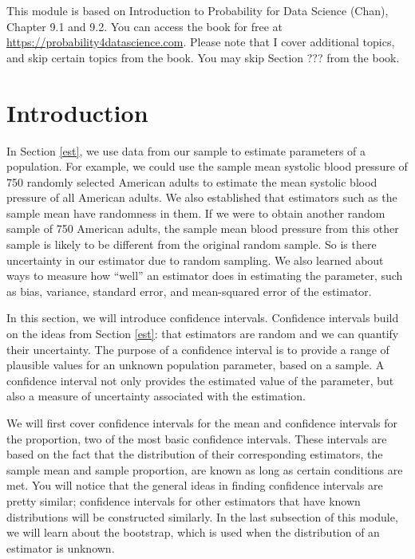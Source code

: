 \documentclass[
]{book}
\begin{document}
This module is based on Introduction to Probability for Data Science (Chan), Chapter 9.1 and 9.2. You can access the book for free at \url{https://probability4datascience.com}. Please note that I cover additional topics, and skip certain topics from the book. You may skip Section ??? from the book.

\section{Introduction}\label{introduction-4}

In Section \ref{est}, we use data from our sample to estimate parameters of a population. For example, we could use the sample mean systolic blood pressure of 750 randomly selected American adults to estimate the mean systolic blood pressure of all American adults. We also established that estimators such as the sample mean have randomness in them. If we were to obtain another random sample of 750 American adults, the sample mean blood pressure from this other sample is likely to be different from the original random sample. So is there uncertainty in our estimator due to random sampling. We also learned about ways to measure how ``well'' an estimator does in estimating the parameter, such as bias, variance, standard error, and mean-squared error of the estimator.

In this section, we will introduce confidence intervals. Confidence intervals build on the ideas from Section \ref{est}: that estimators are random and we can quantify their uncertainty. The purpose of a confidence interval is to provide a range of plausible values for an unknown population parameter, based on a sample. A confidence interval not only provides the estimated value of the parameter, but also a measure of uncertainty associated with the estimation.

We will first cover confidence intervals for the mean and confidence intervals for the proportion, two of the most basic confidence intervals. These intervals are based on the fact that the distribution of their corresponding estimators, the sample mean and sample proportion, are known as long as certain conditions are met. You will notice that the general ideas in finding confidence intervals are pretty similar; confidence intervals for other estimators that have known distributions will be constructed similarly. In the last subsection of this module, we will learn about the bootstrap, which is used when the distribution of an estimator is unknown.
\end{document}
